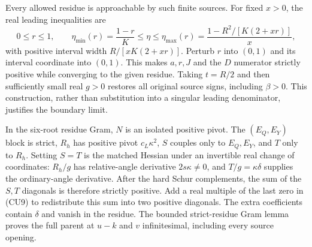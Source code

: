 Every allowed residue is approachable by such finite sources. For
fixed $x>0$, the real leading inequalities are
\[
 0\le r\le1,\qquad
 \eta_{\min}(r)=\frac{1-r}{K}\le\eta\le
 \eta_{\max}(r)=\frac{1-R^2/[K(2+xr)]}{x},
\]
with positive interval width $R/[xK(2+xr)]$. Perturb $r$ into
$(0,1)$ and its interval coordinate into $(0,1)$.
This makes $a,r,J$ and the $D$ numerator strictly positive while
converging to the given residue. Taking $t=R/2$ and then sufficiently
small real $g>0$ restores all original source signs, including
$\beta>0$. This construction, rather than substitution into a
singular leading denominator, justifies the boundary limit.

In the six-root residue Gram, $N$ is an isolated positive pivot.
The $(E_Q,E_Y)$ block is strict, $R_h$ has positive pivot
$c_L\kappa^2$, $S$ couples only to $E_Q,E_Y$, and $T$ only to $R_h$.
Setting $S=T$ is the matched Hessian under an invertible real change
of coordinates: $R_h/g$ has relative-angle derivative $2s\kappa\ne0$,
and $T/g=\kappa\delta$ supplies the ordinary-angle derivative.
After the hard Schur complements, the sum of the $S,T$ diagonals is
therefore strictly positive. Add a real multiple of the last zero
in (CU9) to redistribute this sum into two positive diagonals.
The extra coefficients contain $\delta$ and vanish in the residue.
The bounded strict-residue Gram lemma proves the full parent at
$u-k$ and $v$ infinitesimal, including every source opening.

